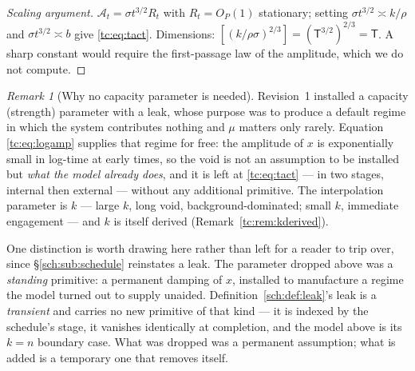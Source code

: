 \documentclass[11pt]{article}
\numberwithin{equation}{section}
\theoremstyle{plain}
\theoremstyle{definition}
\theoremstyle{remark}
\newtheorem{remark}[theorem]{Remark}
\newcommand{\Ac}{\mathcal{A}}
\begin{document}
\begin{proof}[Scaling argument]
$\Ac_t=\sigma t^{3/2}R_t$ with $R_t=O_P(1)$ stationary; setting
$\sigma t^{3/2}\asymp k/\rho$ and $\sigma t^{3/2}\asymp b$ give
\eqref{tc:eq:tact}. Dimensions:
$[(k/\rho\sigma)^{2/3}]=(\mathsf T^{3/2})^{2/3}=\mathsf T$. A sharp
constant would require the first-passage law of the amplitude, which we
do not compute.
\end{proof}

\begin{remark}[Why no capacity parameter is needed]
\label{tc:rem:nocapacity}
Revision~1 installed a capacity (strength) parameter with a leak, whose
purpose was to produce a default regime in which the system contributes
nothing and $\mu$ matters only rarely. Equation \eqref{tc:eq:logamp}
supplies that regime for free: the amplitude of $x$ is exponentially
small in log-time at early times, so the void is not an assumption to be
installed but \emph{what the model already does}, and it is left at
\eqref{tc:eq:tact} --- in two stages, internal then external --- without
any additional primitive. The interpolation
parameter is $k$ --- large $k$, long void, background-dominated; small
$k$, immediate engagement --- and $k$ is itself derived
(Remark~\ref{tc:rem:kderived}).

One distinction is worth drawing here rather than left for a reader to
trip over, since \S\ref{sch:sub:schedule} reinstates a leak. The
parameter dropped above was a \emph{standing} primitive: a permanent
damping of $x$, installed to manufacture a regime the model turned out to
supply unaided. Definition~\ref{sch:def:leak}'s leak is a \emph{transient}
and carries no new primitive of that kind --- it is indexed by the
schedule's stage, it vanishes identically at completion, and the model
above is its $k=n$ boundary case. What was dropped was a permanent
assumption; what is added is a temporary one that removes itself.
\end{remark}
\end{document}
